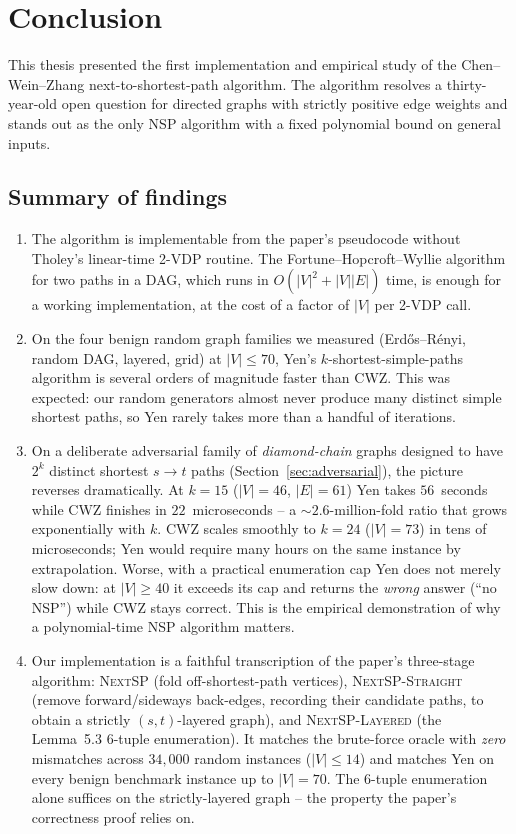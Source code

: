 \chapter{Conclusion}
\label{ch:conclusion}

This thesis presented the first implementation and empirical study of
the Chen--Wein--Zhang next-to-shortest-path algorithm. The algorithm
resolves a thirty-year-old open question for directed graphs with
strictly positive edge weights and stands out as the only NSP algorithm
with a fixed polynomial bound on general inputs.

\section{Summary of findings}

\begin{enumerate}
  \item The algorithm is implementable from the paper's pseudocode
    without Tholey's linear-time 2-VDP routine. The
    Fortune--Hopcroft--Wyllie algorithm for two paths in a DAG, which
    runs in $O(|V|^{2}+|V||E|)$ time, is enough for a working
    implementation, at the cost of a factor of $|V|$ per 2-VDP call.
  \item On the four benign random graph families we measured
    (Erd\H{o}s--R\'enyi, random DAG, layered, grid) at $|V|\le 70$,
    Yen's $k$-shortest-simple-paths algorithm is several orders of
    magnitude faster than CWZ. This was expected: our random generators
    almost never produce many distinct simple shortest paths, so Yen
    rarely takes more than a handful of iterations.
  \item On a deliberate adversarial family of \emph{diamond-chain}
    graphs designed to have $2^{k}$ distinct shortest $s\to t$ paths
    (Section~\ref{sec:adversarial}), the picture reverses dramatically.
    At $k=15$ ($|V|=46$, $|E|=61$) Yen takes $56$~seconds while CWZ
    finishes in $22$~microseconds -- a ${\sim}2.6$-million-fold ratio
    that grows exponentially with $k$. CWZ scales smoothly to $k=24$
    ($|V|=73$) in tens of microseconds; Yen would require many hours on
    the same instance by extrapolation. Worse, with a practical
    enumeration cap Yen does not merely slow down: at $|V|\ge 40$ it
    exceeds its cap and returns the \emph{wrong} answer (``no NSP'')
    while CWZ stays correct. This is the empirical demonstration of why
    a polynomial-time NSP algorithm matters.
  \item Our implementation is a faithful transcription of the paper's
    three-stage algorithm: \textsc{NextSP} (fold off-shortest-path
    vertices), \textsc{NextSP-Straight} (remove forward/sideways
    back-edges, recording their candidate paths, to obtain a strictly
    $(s,t)$-layered graph), and \textsc{NextSP-Layered} (the Lemma~5.3
    $6$-tuple enumeration). It matches the brute-force oracle with
    \emph{zero} mismatches across $34{,}000$ random instances
    ($|V|\le 14$) and matches Yen on every benign benchmark instance up
    to $|V|=70$. The $6$-tuple enumeration alone
    suffices on the strictly-layered graph -- the property the paper's
    correctness proof relies on.
\end{enumerate}

